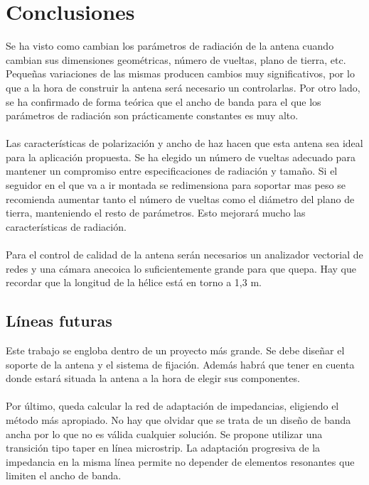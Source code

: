 \documentclass[12pt]{article}
\begin{document}
\section{Conclusiones}
Se ha visto como cambian los parámetros de radiación de la antena cuando cambian sus dimensiones geométricas, número de vueltas, plano de tierra, etc. Pequeñas variaciones de las mismas producen cambios muy significativos, por lo que a la hora de construir la antena será necesario un controlarlas. Por otro lado, se ha confirmado de forma teórica que el ancho de banda para el que los parámetros de radiación son prácticamente constantes es muy  alto.\\\\
Las características de polarización y ancho de haz hacen que esta antena sea ideal para la aplicación propuesta. Se ha elegido un número de vueltas adecuado para mantener un compromiso entre especificaciones de radiación y tamaño. Si el seguidor en el que va a ir montada se redimensiona para soportar mas peso se recomienda aumentar tanto el número de vueltas como el diámetro del plano de tierra, manteniendo el resto de parámetros. Esto mejorará mucho las características de radiación.\\\\
Para el control de calidad de la antena serán necesarios un analizador vectorial de redes y una cámara anecoica lo suficientemente grande para que quepa. Hay que recordar que la longitud de la hélice está en torno a 1,3 m.

\subsection{Líneas futuras}
Este trabajo se engloba dentro de un proyecto más grande. Se debe diseñar el soporte de la antena y el sistema de fijación. Además habrá que tener en cuenta donde estará situada la antena a la hora de elegir sus componentes.\\\\
Por último, queda calcular la red de adaptación de impedancias, eligiendo el método más apropiado. No hay que olvidar que se trata de un diseño de banda ancha por lo que no es válida cualquier solución. Se propone utilizar una transición tipo taper en línea microstrip. La adaptación progresiva de la impedancia en la misma línea permite no depender de elementos resonantes que limiten el ancho de banda.
\end{document}
